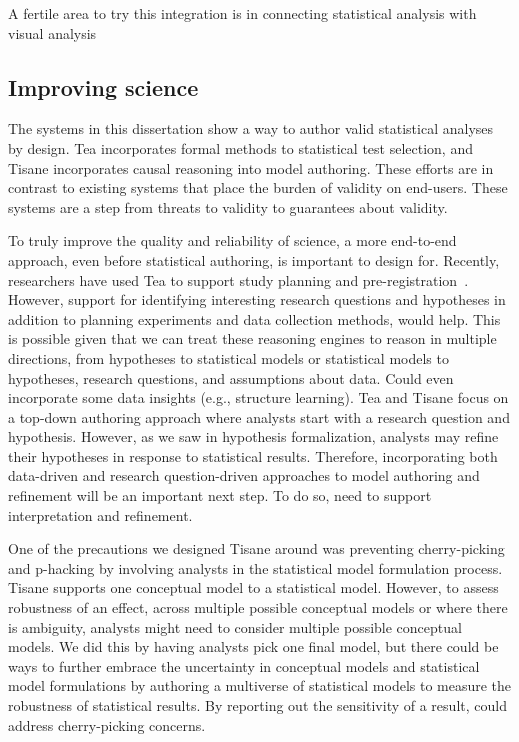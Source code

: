 A fertile area to try this integration is in connecting statistical analysis with visual analysis

\subsection{Improving science}
The systems in this dissertation show a way to author valid statistical analyses
by design. Tea incorporates formal methods to statistical test selection, and
Tisane incorporates causal reasoning into model authoring. These efforts are in
contrast to existing systems that place the burden of validity on end-users.
These systems are a step from threats to validity to guarantees about validity. 

To truly improve the quality and reliability of science, a more end-to-end
approach, even before statistical authoring, is important to design for.
Recently, researchers have used Tea to support study planning and
pre-registration~\cite{rock}. However, support for identifying interesting
research questions and hypotheses in addition to planning experiments and data
collection methods, would help. This is possible given that we can treat these
reasoning engines to reason in multiple directions, from hypotheses to
statistical models or statistical models to hypotheses, research questions, and
assumptions about data. Could even incorporate some data insights (e.g.,
structure learning). 
Tea and Tisane focus on a top-down authoring approach where analysts start with
a research question and hypothesis. However, as we saw in hypothesis
formalization, analysts may refine their hypotheses in response to statistical
results. Therefore, incorporating both data-driven and research question-driven
approaches to model authoring and refinement will be an important next step. To
do so, need to support interpretation and refinement. 

One of the precautions we designed Tisane around was preventing
cherry-picking and p-hacking by involving analysts in the statistical model
formulation process.
Tisane supports one conceptual model to a statistical model. However, to assess
robustness of an effect, across multiple possible conceptual models or where
there is ambiguity, analysts might need to consider multiple possible conceptual
models. We did this by having analysts pick one final model, but there could be
ways to further embrace the uncertainty in conceptual models and statistical
model formulations by authoring a multiverse of statistical models to measure
the robustness of statistical results. By reporting out the sensitivity of a
result, could address cherry-picking concerns. 


